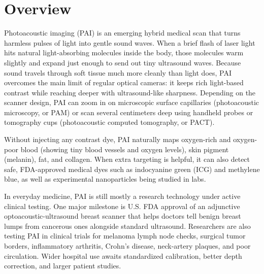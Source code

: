 \label{ch:infographic-pai}

\section{Overview}

Photoacoustic imaging (PAI) is an emerging hybrid medical scan that turns harmless pulses of light into gentle sound waves. When a brief flash of laser light hits natural light-absorbing molecules inside the body, those molecules warm slightly and expand just enough to send out tiny ultrasound waves. Because sound travels through soft tissue much more cleanly than light does, PAI overcomes the main limit of regular optical cameras: it keeps rich light-based contrast while reaching deeper with ultrasound-like sharpness. Depending on the scanner design, PAI can zoom in on microscopic surface capillaries (photoacoustic microscopy, or PAM) or scan several centimeters deep using handheld probes or tomography cups (photoacoustic computed tomography, or PACT).

Without injecting any contrast dye, PAI naturally maps oxygen-rich and oxygen-poor blood (showing tiny blood vessels and oxygen levels), skin pigment (melanin), fat, and collagen. When extra targeting is helpful, it can also detect safe, FDA-approved medical dyes such as indocyanine green (ICG) and methylene blue, as well as experimental nanoparticles being studied in labs.

In everyday medicine, PAI is still mostly a research technology under active clinical testing. One major milestone is U.S. FDA approval of an adjunctive optoacoustic-ultrasound breast scanner that helps doctors tell benign breast lumps from cancerous ones alongside standard ultrasound. Researchers are also testing PAI in clinical trials for melanoma lymph node checks, surgical tumor borders, inflammatory arthritis, Crohn's disease, neck-artery plaques, and poor circulation. Wider hospital use awaits standardized calibration, better depth correction, and larger patient studies.

